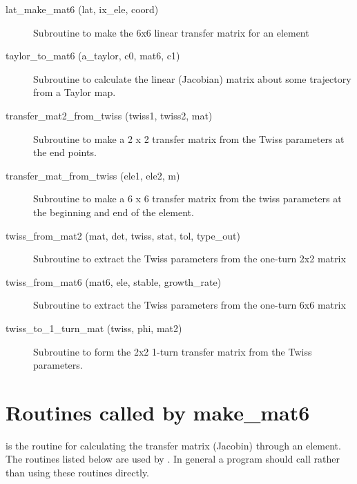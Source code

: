 \begin{description}
\item[lat_make_mat6 (lat, ix_ele, coord)] \Newline
Subroutine to make the 6x6 linear transfer matrix for an element 

\item[taylor_to_mat6 (a_taylor, c0, mat6, c1)] \Newline
Subroutine to calculate the linear (Jacobian) matrix about some trajectory from a Taylor map. 

\item[transfer_mat2_from_twiss (twiss1, twiss2, mat)] \Newline
Subroutine to make a 2 x 2 transfer matrix from the Twiss parameters at the end points. 

\item[transfer_mat_from_twiss (ele1, ele2, m)] \Newline 
Subroutine to make a 6 x 6 transfer matrix from the twiss parameters
at the beginning and end of the element.

\item[twiss_from_mat2 (mat, det, twiss, stat, tol, type_out)] \Newline
Subroutine to extract the Twiss parameters from the one-turn 2x2 matrix 

\item[twiss_from_mat6 (mat6, ele, stable, growth_rate)] \Newline
Subroutine to extract the Twiss parameters from the one-turn 6x6 matrix 

\item[twiss_to_1_turn_mat (twiss, phi, mat2)] \Newline
Subroutine to form the 2x2 1-turn transfer matrix from the Twiss parameters. 

\end{description}

\section{Routines called by make_mat6}
\label{r:mat6}
 
 is the routine for calculating the transfer matrix (Jacobin)
through an element. The routines listed below are used by .
In general a program should call  rather than using these
routines directly.

